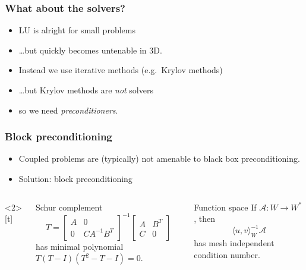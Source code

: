 \documentclass[presentation]{beamer}
\begin{document}
\begin{frame}[t]
  \frametitle{What about the solvers?}
  \begin{itemize}
  \item LU is alright for small problems
  \item \dots but quickly becomes untenable in 3D.
  \item Instead we use iterative methods (e.g.~Krylov methods)
  \item<2-> \dots but Krylov methods are \emph{not} solvers
  \item<3-> so we need \emph{preconditioners}.
  \end{itemize}
\end{frame}
\begin{frame}
  \frametitle{Block preconditioning}
  \begin{itemize}
  \item Coupled problems are (typically) not amenable to black
    box preconditioning.
  \item<2-> Solution: block preconditioning
  \end{itemize}
  \begin{columns}<2>[t]
    \begin{column}{0.5\textwidth}
      \begin{block}{Schur complement}
        \begin{equation*}
          T = \begin{bmatrix}
            A & 0 \\
            0 & C A^{-1} B^T
          \end{bmatrix}^{-1}
          \begin{bmatrix}
            A & B^T \\
            C & 0
          \end{bmatrix}
        \end{equation*}
        has minimal polynomial $T(T - I)(T^2 - T - I) = 0$.
        \nocite{Murphy:2000,Ipsen:2001,Benzi:2005}
      \end{block}
    \end{column}
    \hspace{1em}
    \begin{column}{0.5\textwidth}
      \begin{block}{Function space}
        If $\mathcal{A} : W \rightarrow W^*$, then
        \begin{equation*}
          \langle u, v \rangle_W^{-1} \mathcal{A}
        \end{equation*}
        has mesh independent condition number.
        \nocite{Malek:2014,Mardal:2011,Kirby:2010}
      \end{block}
    \end{column}
  \end{columns}
\end{frame}
\end{document}
